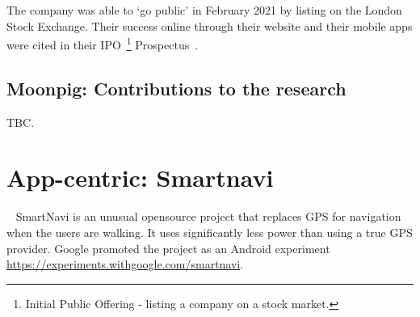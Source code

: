 The company was able to `go public' in February 2021 by listing on the London Stock Exchange.  Their success online through their website and their mobile apps were cited in their IPO~\footnote{Initial Public Offering - listing a company on a stock market.} Prospectus~.

\subsection{Moonpig: Contributions to the research}
TBC.


\clearpage


\section{App-centric: Smartnavi}~\label{case-study-overview-smartnavi} 
SmartNavi is an unusual opensource project that replaces GPS for navigation when the users are walking. It uses significantly less power than using a true GPS provider. Google promoted the project as an Android experiment \url{https://experiments.withgoogle.com/smartnavi}.

